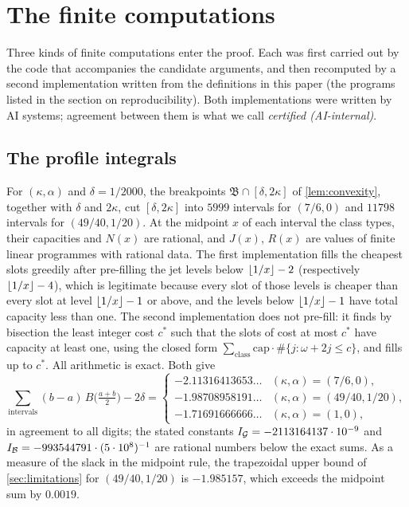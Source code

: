 \section{The finite computations}\label{app:certificates}

Three kinds of finite computations enter the proof. Each was first carried out by the code that
accompanies the candidate arguments, and then recomputed by a second implementation written
from the definitions in this paper (the programs listed in the section on reproducibility). Both implementations were written by
AI systems; agreement between them is what we call \emph{certified (AI-internal)}.

\subsection{The profile integrals}\label{app:profile-certificate}

For $(\kappa,\alpha)$ and $\delta=1/2000$, the breakpoints $\mathfrak B\cap[\delta,2\kappa]$ of
\cref{lem:convexity}, together with $\delta$ and $2\kappa$, cut $[\delta,2\kappa]$ into $5999$
intervals for $(7/6,0)$ and $11798$ intervals for $(49/40,1/20)$. At the midpoint $x$ of each
interval the class types, their capacities and $N(x)$ are rational, and $J(x)$, $R(x)$ are
values of finite linear programmes with rational data. The first implementation fills the
cheapest slots greedily after pre-filling the jet levels below $\left\lfloor 1/x\right\rfloor-2$ (respectively
$\left\lfloor 1/x\right\rfloor-4$), which is legitimate because every slot of those levels is cheaper than every
slot at level $\left\lfloor 1/x\right\rfloor-1$ or above, and the levels below $\left\lfloor 1/x\right\rfloor-1$ have total capacity
less than one. The second implementation does not pre-fill: it finds by bisection the least
integer cost $c^*$ such that the slots of cost at most $c^*$ have capacity at least one, using the
closed form $\sum_{\text{class}}\mathrm{cap}\cdot\#\{j:\omega+2j\le c\}$, and fills up to $c^*$.
All arithmetic is exact. Both give
\[
  \sum_{\text{intervals}}(b-a)\,B\bigl(\tfrac{a+b}2\bigr)-2\delta=
  \begin{cases}-2.11316413653\ldots&(\kappa,\alpha)=(7/6,0),\\
  -1.98708958191\ldots&(\kappa,\alpha)=(49/40,1/20),\\
  -1.71691666666\ldots&(\kappa,\alpha)=(1,0),\end{cases}
\]
in agreement to all digits; the stated constants $I_{\mathcal{G}}=-2113164137\cdot10^{-9}$ and
$I_{\mathcal{B}}=-993544791\cdot(5\cdot10^{8})^{-1}$ are rational numbers below the exact sums. As a
measure of the slack in the midpoint rule, the trapezoidal upper bound of \cref{sec:limitations}
for $(49/40,1/20)$ is $-1.985157$, which exceeds the midpoint sum by $0.0019$.

